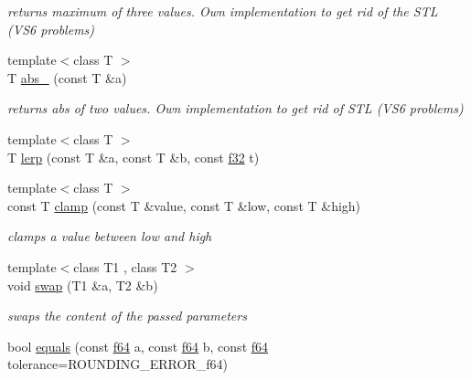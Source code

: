 \begin{DoxyCompactItemize}
\begin{DoxyCompactList}\small\item\em returns maximum of three values. Own implementation to get rid of the S\+TL (V\+S6 problems) \end{DoxyCompactList}\item 
{\footnotesize template$<$class T $>$ }\\T \hyperlink{namespaceirr_1_1core_a2cab2ba5899c9262ca29501ea7551c91}{abs\+\_\+} (const T \&a)\hypertarget{namespaceirr_1_1core_a2cab2ba5899c9262ca29501ea7551c91}{}\label{namespaceirr_1_1core_a2cab2ba5899c9262ca29501ea7551c91}

\begin{DoxyCompactList}\small\item\em returns abs of two values. Own implementation to get rid of S\+TL (V\+S6 problems) \end{DoxyCompactList}\item 
{\footnotesize template$<$class T $>$ }\\T \hyperlink{namespaceirr_1_1core_ae2e6a5729b911d26565b508e8b8dae91}{lerp} (const T \&a, const T \&b, const \hyperlink{namespaceirr_a0277be98d67dc26ff93b1a6a1d086b07}{f32} t)
\item 
{\footnotesize template$<$class T $>$ }\\const T \hyperlink{namespaceirr_1_1core_a6162f685b68f629e77336081d3316969}{clamp} (const T \&value, const T \&low, const T \&high)\hypertarget{namespaceirr_1_1core_a6162f685b68f629e77336081d3316969}{}\label{namespaceirr_1_1core_a6162f685b68f629e77336081d3316969}

\begin{DoxyCompactList}\small\item\em clamps a value between low and high \end{DoxyCompactList}\item 
{\footnotesize template$<$class T1 , class T2 $>$ }\\void \hyperlink{namespaceirr_1_1core_ab565e5d5112b21ff9b96a0ca0c9b89ad}{swap} (T1 \&a, T2 \&b)\hypertarget{namespaceirr_1_1core_ab565e5d5112b21ff9b96a0ca0c9b89ad}{}\label{namespaceirr_1_1core_ab565e5d5112b21ff9b96a0ca0c9b89ad}

\begin{DoxyCompactList}\small\item\em swaps the content of the passed parameters \end{DoxyCompactList}\item 
bool \hyperlink{namespaceirr_1_1core_abf9b9b140cc365908ea4c8c47451e4e3}{equals} (const \hyperlink{namespaceirr_a1325b02603ad449f92c68fc640af9b28}{f64} a, const \hyperlink{namespaceirr_a1325b02603ad449f92c68fc640af9b28}{f64} b, const \hyperlink{namespaceirr_a1325b02603ad449f92c68fc640af9b28}{f64} tolerance=R\+O\+U\+N\+D\+I\+N\+G\+\_\+\+E\+R\+R\+O\+R\+\_\+f64)\hypertarget{namespaceirr_1_1core_abf9b9b140cc365908ea4c8c47451e4e3}{}\label{namespaceirr_1_1core_abf9b9b140cc365908ea4c8c47451e4e3}


\end{DoxyCompactItemize}
